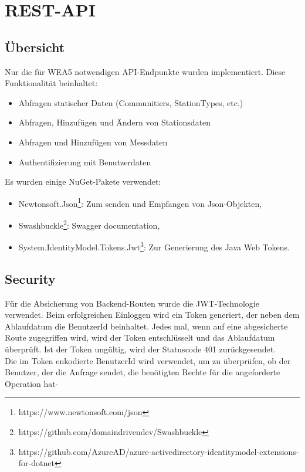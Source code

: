 \section{REST-API}
\label{rest}

\subsection{Übersicht}

Nur die für WEA5 notwendigen API-Endpunkte wurden implementiert. Diese Funktionalität beinhaltet:
\begin{itemize}
    \item Abfragen statischer Daten (Communitiers, StationTypes, etc.)
    \item Abfragen, Hinzufügen und Ändern von Stationsdaten
    \item Abfragen und Hinzufügen von Messdaten
    \item Authentifizierung mit Benutzerdaten
\end{itemize}

Es wurden einige NuGet-Pakete verwendet:
\begin{itemize}
    \item Newtonsoft.Json\footnote{https://www.newtonsoft.com/json}: Zum senden und Empfangen von Json-Objekten,
    \item Swashbuckle\footnote{https://github.com/domaindrivendev/Swashbuckle}: Swagger documentation,
    \item System.IdentityModel.Tokens.Jwt\footnote{https://github.com/AzureAD/azure-activedirectory-identitymodel-extensions-for-dotnet}: Zur Generierung des Java Web Tokens.
\end{itemize}

\subsection{Security}

Für die Absicherung von Backend-Routen wurde die JWT-Technologie verwendet.
Beim erfolgreichen Einloggen wird ein Token generiert, der neben dem Ablaufdatum die BenutzerId beinhaltet. Jedes mal, wenn auf eine abgesicherte Route zugegriffen wird, wird der Token entschlüsselt und das Ablaufdatum überprüft. Ist der Token ungültig, wird der Statuscode 401 zurückgesendet.\\

Die im Token enkodierte BenutzerId wird verwendet, um zu überprüfen, ob der Benutzer, der die Anfrage sendet, die benötigten Rechte für die angeforderte Operation hat-

